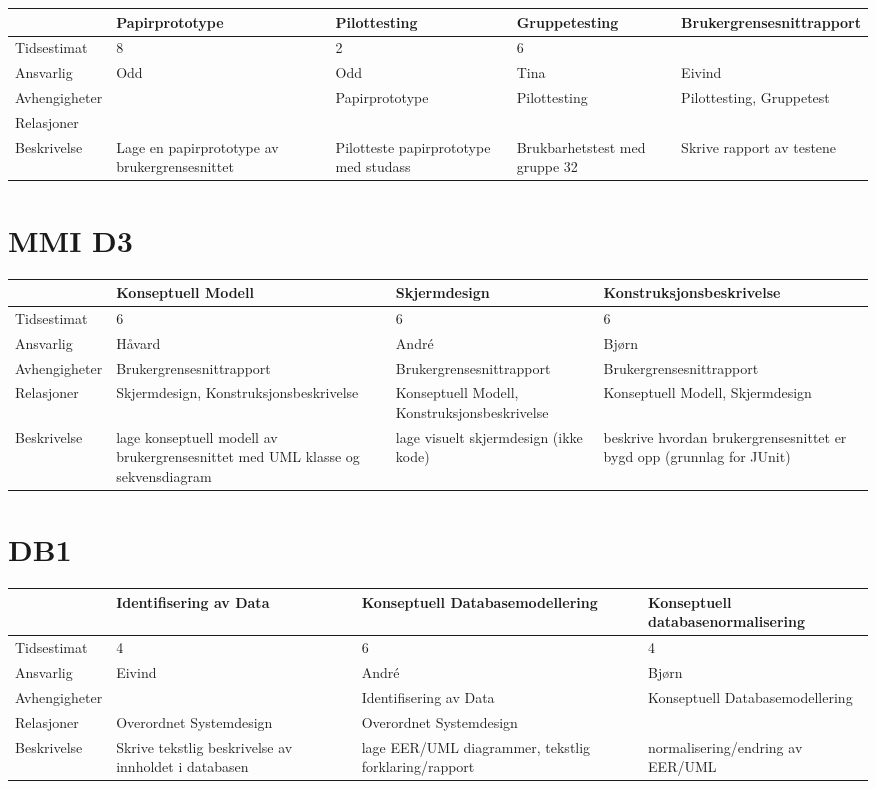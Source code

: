 \documentclass{article}
\begin{document}
\begin{tabular}{|p{3cm}|p{3cm}|p{3cm}|p{3cm}|p{3cm}|}
\hline
& Papirprototype & Pilottesting & Gruppetesting & Brukergrensesnittrapport
\\ \hline
Tidsestimat & 8 & 2 & 6 &  \\ \hline
Ansvarlig & Odd & Odd & Tina & Eivind \\ \hline
Avhengigheter &  & Papirprototype & Pilottesting & Pilottesting, Gruppetest
\\ \hline
Relasjoner &  &  &  &  \\ \hline
Beskrivelse & Lage en papirprototype av brukergrensesnittet & Pilotteste
papirprototype med studass & Brukbarhetstest med gruppe 32 & Skrive rapport
av testene \\ \hline
\end{tabular}

\section{MMI D3}

\begin{tabular}{|l|p{3cm}|p{3cm}|p{3cm}|}
\hline
& Konseptuell Modell & Skjermdesign & Konstruksjonsbeskrivelse \\ \hline
Tidsestimat & 6 & 6 & 6 \\ \hline
Ansvarlig & H\aa vard & Andr\'e & Bj\o rn \\ \hline
Avhengigheter & Brukergrensesnittrapport & Brukergrensesnittrapport & 
Brukergrensesnittrapport \\ \hline
Relasjoner & Skjermdesign, Konstruksjonsbeskrivelse & Konseptuell Modell,
Konstruksjonsbeskrivelse & Konseptuell Modell, Skjermdesign \\ \hline
Beskrivelse & lage konseptuell modell av brukergrensesnittet med UML klasse
og sekvensdiagram & lage visuelt skjermdesign (ikke kode) & beskrive hvordan
brukergrensesnittet er bygd opp (grunnlag for JUnit) \\ \hline
\end{tabular}

\section{DB1}

\begin{tabular}{|l|p{3cm}|p{3cm}|p{3cm}|}
\hline
& Identifisering av Data & Konseptuell Databasemodellering & Konseptuell
databasenormalisering \\ \hline
Tidsestimat & 4 & 6 & 4 \\ \hline
Ansvarlig & Eivind & Andr\'e & Bj\o rn \\ \hline
Avhengigheter &  & Identifisering av Data & Konseptuell Databasemodellering
\\ \hline
Relasjoner & Overordnet Systemdesign & Overordnet Systemdesign &  \\ \hline
Beskrivelse & Skrive tekstlig beskrivelse av innholdet i databasen & lage
EER/UML diagrammer, tekstlig forklaring/rapport & normalisering/endring av
EER/UML \\ \hline
\end{tabular}
\end{document}
